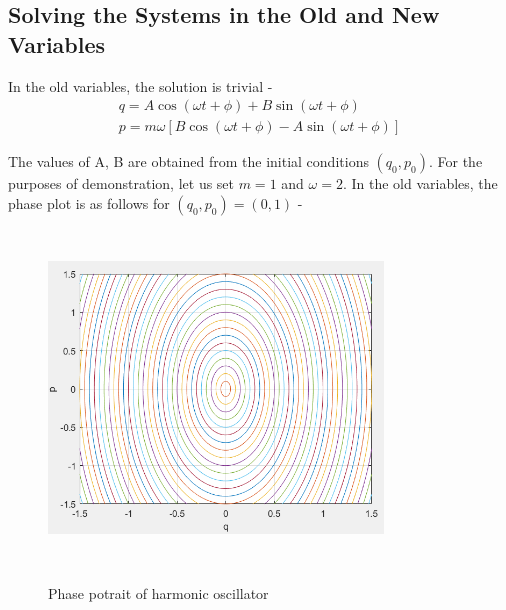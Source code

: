 \documentclass{article}
\begin{document}
\subsection{Solving the Systems in the Old and New Variables}

\justify
%
In the old variables, the solution is trivial -
\begin{align*}
q = A\cos{(\omega t + \phi)} + B\sin{(\omega t + \phi)} \tag{8.9}\label{eq:8.9}\\
p = m\omega\left[B\cos{(\omega t + \phi)} - A\sin{(\omega t + \phi)}\right] \tag{8.10}\label{eq:8.10}
\end{align*}

\justify
The values of A, B are obtained from the initial conditions $(q_0, p_0)$. For the purposes of demonstration, let us set $m=1$ and $\omega=2$. In the old variables, the phase plot is as follows for $(q_0, p_0) = (0,1)$ -

\begin{figure}[!htb]
    \centering
    \includegraphics[width=3.5in,height=3.5in,keepaspectratio]{HarmonicPhasePotrait.PNG}
    \label{fig:oldHarmonic}
    \caption{Phase potrait of harmonic oscillator}
\end{figure}
\end{document}

